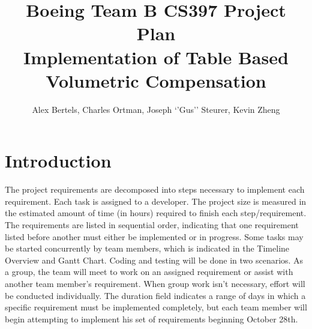 \documentclass[pdftex,10pt,a4paper]{article}
\title{Boeing Team B CS397 Project Plan\\
{\small Implementation of Table Based Volumetric Compensation} }
\author{Alex Bertels, Charles Ortman, Joseph `'Gus'' Steurer, Kevin Zheng}
\date{}
\begin{document}
\maketitle

\section*{Introduction}
The project requirements are decomposed into steps necessary to implement each requirement. Each task is assigned to a developer. The project size is measured in the estimated amount of time (in hours) required to finish each step/requirement. The requirements are listed in sequential order, indicating that one requirement listed before another must either be implemented or in progress. Some tasks may be started concurrently by team members, which is indicated in the Timeline Overview and Gantt Chart. Coding and testing will be done in two scenarios. As a group, the team will meet to work on an assigned requirement or assist with another team member's requirement. When group work isn't necessary, effort will be conducted individually. The duration field indicates a range of days in which a specific requirement must be implemented completely, but each team member will begin attempting to implement his set of requirements beginning October 28th.
\end{document}
